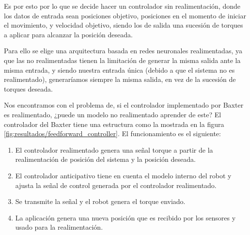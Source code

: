 Es por esto por lo que se decide hacer un controlador sin realimentación, donde los datos de entrada sean posiciones objetivo, posiciones en el momento de iniciar el movimiento, y velocidad objetivo, siendo los de salida una sucesión de torques a aplicar para alcanzar la posición deseada.

Para ello se elige una arquitectura basada en redes neuronales realimentadas, ya que las no realimentadas tienen la limitación de generar la misma salida ante la misma entrada, y siendo nuestra entrada única (debido a que el sistema no es realimentado), generaríamos siempre la misma salida, en vez de la sucesión de torques deseada.

Nos encontramos con el problema de, si el controlador implementado por Baxter es realimentado, ¿puede un modelo no realimentado aprender de este? %
El controlador del Baxter tiene una estructura como la mostrada en la figura \ref{fig:resultados/feedforward_controller}. El funcionamiento es el siguiente:

\begin{enumerate}
\item El controlador realimentado genera una señal torque a partir de la realimentación de posición del sistema y la posición deseada.
\item El controlador anticipativo tiene en cuenta el modelo interno del robot y ajusta la señal de control generada por el controlador realimentado.
\item Se transmite la señal y el robot genera el torque enviado.
\item La aplicación genera una nueva posición que es recibido por los sensores y usado para la realimentación.
\end{enumerate}

